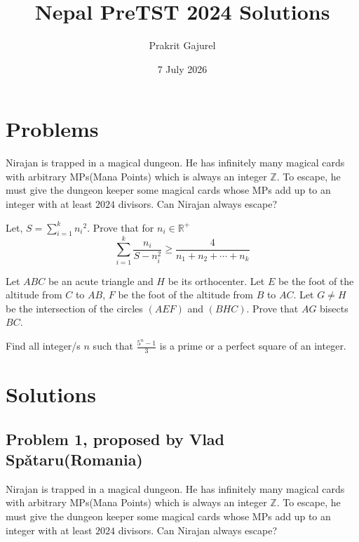 \documentclass[11pt]{scrartcl}
\begin{document}
\title{Nepal PreTST 2024 Solutions}
\author{Prakrit Gajurel}
\date{7 July 2026}
\maketitle

\section{Problems}

\begin{problem}
    Nirajan is trapped in a magical dungeon. He has infinitely many magical cards with arbitrary MPs(Mana Points) which is always an integer 
    $\mathbb{Z}$. To escape, he must give the dungeon keeper some magical cards whose MPs add up to an integer with at least $2024$ divisors. 
    Can Nirajan always escape?
\end{problem}

\begin{problem}
    Let, $\displaystyle{S =\sum_{i=1}^{k} {n_i}^2}$. Prove that for $n_i \in \mathbb{R}^+$
    $$\sum_{i=1}^{k} \frac{n_i}{S-n_i^2} \geq \frac{4}{n_1+n_2+ \cdots+ n_k}$$
\end{problem}

\begin{problem}
    Let $ABC$ be an acute triangle and $H$ be its orthocenter. Let $E$ be the foot of the altitude from $C$ to $AB$, 
    $F$ be the foot of the altitude from $B$ to $AC$. Let $G \neq H$ be the intersection of the circles $(AEF)$ and $(BHC)$.
    Prove that $AG$ bisects $BC$.
\end{problem}

\begin{problem}
    Find all integer/s $n$ such that $\displaystyle{\frac{5^n-1}{3}}$ is a prime or a perfect square of an integer.
\end{problem}

\newpage

\section{Solutions}

\subsection{Problem 1, proposed by Vlad Spǎtaru(Romania)}

\begin{problem}
    Nirajan is trapped in a magical dungeon. He has infinitely many magical cards with arbitrary MPs(Mana Points) which is always an integer 
    $\mathbb{Z}$. To escape, he must give the dungeon keeper some magical cards whose MPs add up to an integer with at least $2024$ divisors. 
    Can Nirajan always escape?
\end{problem}
\end{document}
